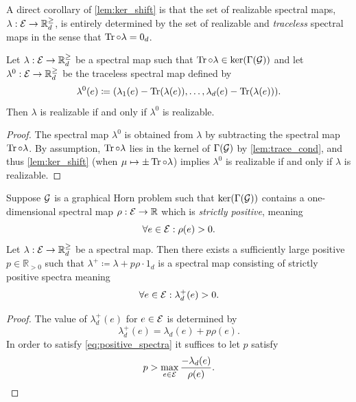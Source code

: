 \documentclass[notitlepage, 10pt]{article}
\begin{document}
A direct corollary of \cref{lem:ker_shift} is that the set of realizable spectral maps, $\lambda : \mathcal E \to \mathbb R^{\geq}_{d}$, is entirely determined by the set of realizable and \textit{traceless} spectral maps in the sense that $\operatorname{Tr}\circ \lambda = 0_d$.
\begin{cor}
    Let $\lambda : \mathcal E \to \mathbb R^{\geq}_{d}$ be a spectral map such that $\operatorname{Tr}\circ\lambda \in \ker(\Gamma(\mathcal G))$ and let $\lambda^{0} : \mathcal E \to \mathbb R^{\geq}_{d}$ be the traceless spectral map defined by
    \begin{equation}
        \lambda^{0}(e) \coloneqq (\lambda_1(e) - \operatorname{Tr}(\lambda(e)), \ldots, \lambda_d(e) - \operatorname{Tr}(\lambda(e))).
    \end{equation}
    Then $\lambda$ is realizable if and only if $\lambda^{0}$ is realizable.
\end{cor}
\begin{proof}
    The spectral map $\lambda^{0}$ is obtained from $\lambda$ by subtracting the spectral map $\operatorname{Tr}\circ \lambda$. 
    By assumption, $\operatorname{Tr}\circ \lambda$ lies in the kernel of $\Gamma(\mathcal G)$ by \cref{lem:trace_cond}, and thus \cref{lem:ker_shift} (when $\mu \mapsto \pm \operatorname{Tr} \circ \lambda$) implies $\lambda^{0}$ is realizable if and only if $\lambda$ is realizable.
\end{proof}

\begin{cor}
    Suppose $\mathcal G$ is a graphical Horn problem such that $\ker(\Gamma(\mathcal G))$ contains a one-dimensional spectral map $\rho : \mathcal E \to \mathbb R$ which is \textit{strictly positive}, meaning
    \begin{equation}
        \forall e \in \mathcal E : \rho(e) > 0.
    \end{equation}
    Let $\lambda : \mathcal E \to \mathbb R^{\geq}_{d}$ be a spectral map.
    Then there exists a sufficiently large positive $p \in \mathbb R_{>0}$ such that $\lambda^{+} \coloneqq \lambda + p \rho \cdot 1_d$ is a spectral map consisting of strictly positive spectra meaning
    \begin{equation}
        \label{eq:positive_spectra}
        \forall e \in \mathcal E : \lambda^{+}_d(e) > 0.
    \end{equation}
\end{cor}
\begin{proof}
    The value of $\lambda^{+}_d(e)$ for $e \in \mathcal E$ is determined by
    \begin{equation}
        \lambda^{+}_d(e) = \lambda_d(e) + p\rho(e).
    \end{equation}
    In order to satisfy \cref{eq:positive_spectra} it suffices to let $p$ satisfy
    \begin{equation}
        p > \max_{e \in \mathcal E} \frac{-\lambda_d(e)}{\rho(e)}.
    \end{equation}
\end{proof}
\end{document}
